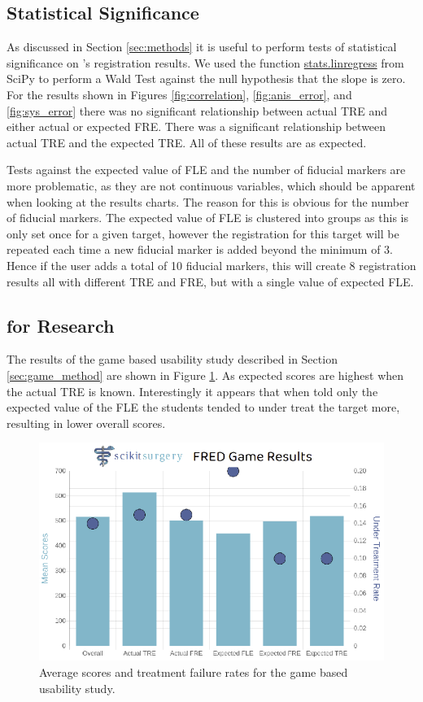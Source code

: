 \subsection{Statistical Significance}
As discussed in Section \ref{sec:methods} it is useful to perform tests of 
statistical significance on \fredns's registration results. 
We used the function \href{https://docs.scipy.org/doc/scipy/reference/generated/scipy.stats.linregress.html}{stats.linregress} from {SciPy}\cite{2020SciPy-NMeth} to
perform a Wald Test against the null hypothesis that the slope is zero. For the
results shown in Figures \ref{fig:correlation}, \ref{fig:anis_error}, 
and \ref{fig:sys_error} there was no significant
relationship between actual \gls{TRE} and either actual or expected \gls{FRE}. There was
a significant relationship between actual \gls{TRE} and the expected \gls{TRE}. All
of these results are as expected.

Tests against the expected value of \gls{FLE} and the number of fiducial markers are
more problematic, as they are not continuous variables, which should be apparent 
when looking at the results charts. The reason for this is obvious for the number
of fiducial markers. The expected value of \gls{FLE} is clustered into groups as this
is only set once for a given target, however the registration for this target 
will be repeated each time a new fiducial marker is added beyond the minimum of 3. Hence 
if the user adds a total of 10 fiducial markers, this will create 8 registration 
results all with different \gls{TRE} and \gls{FRE}, but with a single value of 
expected \gls{FLE}.


\subsection{\fred for Research}
The results of the game based usability study described in Section \ref{sec:game_method}
are shown in 
Figure \ref{fig:usability}. As expected scores are 
highest when the actual \gls{TRE} is known. Interestingly it appears that when told only the expected value of the \gls{FLE} the students
tended to under treat the target more, resulting in lower overall scores. 


\begin{figure}
        \begin{center}
        \includegraphics[width=0.5\linewidth]{usability.eps}
                \caption{\label{fig:usability}Average scores and treatment failure rates for the game based usability study.}
	\end{center}
\end{figure}

